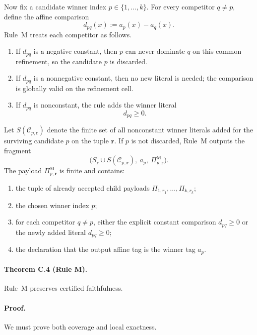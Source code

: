 Now fix a candidate winner index $p\in\{1,\dots,k\}$. For every competitor $q\neq p$, define the affine comparison
\[
 d_{pq}(x):=a_p(x)-a_q(x).
\]
Rule~M treats each competitor as follows.
\begin{enumerate}
    \item If $d_{pq}$ is a negative constant, then $p$ can never dominate $q$ on this common refinement, so the candidate $p$ is discarded.
    \item If $d_{pq}$ is a nonnegative constant, then no new literal is needed; the comparison is globally valid on the refinement cell.
    \item If $d_{pq}$ is nonconstant, the rule adds the winner literal
    \[
    d_{pq}\ge 0.
    \]
\end{enumerate}
Let $S(\mathcal C_{p,\mathbf r})$ denote the finite set of all nonconstant winner literals added for the surviving candidate $p$ on the tuple $\mathbf r$. If $p$ is not discarded, Rule~M outputs the fragment
\[
 \bigl(S_{\mathbf r}\cup S(\mathcal C_{p,\mathbf r}),\ a_p,\ \Pi_{p,\mathbf r}^{\mathrm M}\bigr).
\]
The payload $\Pi_{p,\mathbf r}^{\mathrm M}$ is finite and contains:
\begin{enumerate}
    \item the tuple of already accepted child payloads $\Pi_{1,r_1},\dots,\Pi_{k,r_k}$;
    \item the chosen winner index $p$;
    \item for each competitor $q\neq p$, either the explicit constant comparison $d_{pq}\ge 0$ or the newly added literal $d_{pq}\ge 0$;
    \item the declaration that the output affine tag is the winner tag $a_p$.
\end{enumerate}

\paragraph{Theorem C.4 (Rule M).}
Rule~M preserves certified faithfulness.

\paragraph{Proof.}
We must prove both coverage and local exactness.

